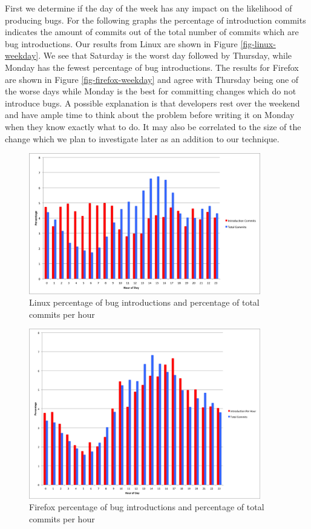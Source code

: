 \documentclass[preprint, 11pt]{sigplanconf}
\begin{document}
First we determine if the day of the week has any impact on the
likelihood of producing bugs. For the following graphs the percentage
of introduction commits indicates the amount of commits out of the
total number of commits which are bug introductions. Our results from
Linux are shown in Figure \ref{fig-linux-weekday}. We see that
Saturday is the worst day followed by Thursday, while Monday has the
fewest percentage of bug introductions. The results for Firefox are
shown in Figure \ref{fig-firefox-weekday} and agree with Thursday
being one of the worse days while Monday is the best for committing
changes which do not introduce bugs. A possible explanation is that
developers rest over the weekend and have ample time to think about
the problem before writing it on Monday when they know exactly what to
do. It may also be correlated to the size of the change which we plan
to investigate later as an addition to our technique.

\begin{figure}
\begin{center}
\includegraphics[width=0.9\textwidth]{linux_hour_of_day.png}
\end{center}
\caption{Linux percentage of bug introductions and percentage of total commits per hour}
\label{fig-linux-hour}
\end{figure}

\begin{figure}
\begin{center}
\includegraphics[width=0.9\textwidth]{firefox_hour_of_day.png}
\end{center}
\caption{Firefox percentage of bug introductions and percentage of total commits per hour}
\label{fig-firefox-hour}
\end{figure}
\end{document}
